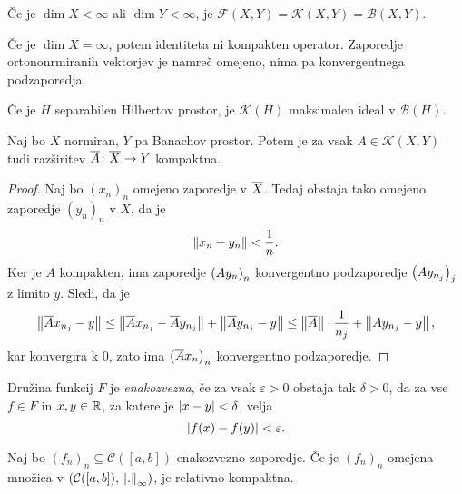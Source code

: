 \begin{zgled}
Če je $\dim X < \infty$ ali $\dim Y < \infty$, je
$\mathcal{F}(X,Y) = \mathcal{K}(X,Y) = \mathcal{B}(X,Y)$.
\end{zgled}

\begin{zgled}
Če je $\dim X = \infty$, potem identiteta ni kompakten operator.
Zaporedje ortononrmiranih vektorjev je namreč omejeno, nima pa
konvergentnega podzaporedja.
\end{zgled}

\begin{opomba}
Če je $H$ separabilen Hilbertov prostor, je $\mathcal{K}(H)$
maksimalen ideal v $\mathcal{B}(H)$.
\end{opomba}

\begin{trditev}
Naj bo $X$ normiran, $Y$ pa Banachov prostor. Potem je za vsak
$A \in \mathcal{K}(X,Y)$ tudi razširitev
$\overline{A} \colon \overline{X} \to Y$ kompaktna.
\end{trditev}

\begin{proof}
Naj bo $(x_n)_n$ omejeno zaporedje v $\overline{X}$. Tedaj obstaja
tako omejeno zaporedje $(y_n)_n$ v $X$, da je
\[
\left\lVert x_n - y_n\right\rVert < \frac{1}{n}.
\]
Ker je $A$ kompakten, ima zaporedje $\left(Ay_n\right)_n$ konvergentno
podzaporedje $\left(Ay_{n_j}\right)_j$ z limito $y$. Sledi, da je
\[
\left\lVert \overline{A}x_{n_j} - y\right\rVert \leq
\left\lVert \overline{A}x_{n_j} - \overline{A}y_{n_j}\right\rVert +
\left\lVert \overline{A}y_{n_j} - y\right\rVert \leq
\left\lVert \overline{A}\right\rVert \cdot \frac{1}{n_j} + \left\lVert Ay_{n_j} - y\right\rVert,
\]
kar konvergira k $0$, zato ima $\left(\overline{A}x_n\right)_n$ konvergentno
podzaporedje.
\end{proof}

\begin{definicija}
Družina funkcij $F$ je
\emph{enakozvezna}, če za vsak
$\varepsilon > 0$ obstaja tak $\delta > 0$, da za vse $f \in F$
in $x,y \in \mathbb{R}$, za katere je $\left\lvert x-y\right\rvert < \delta$, velja
\[
\left\lvert f(x) - f(y)\right\rvert < \varepsilon.
\]
\end{definicija}

\begin{izrek}
Naj bo $(f_n)_n \subseteq \mathcal{C}([a,b])$ enakozvezno
zaporedje. Če je $(f_n)_n$ omejena množica v
$(\mathcal{C}([a,b]), \left\lVert .\right\rVert_\infty)$, je relativno kompaktna.
\end{izrek}

